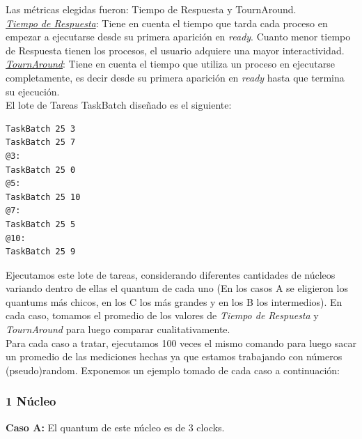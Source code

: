\documentclass[a4paper]{article}
\begin{document}
Las m\'etricas elegidas fueron: Tiempo de Respuesta y TournAround.\\


\underline{\emph{Tiempo de Respuesta}}: Tiene en cuenta el tiempo que tarda cada proceso en empezar a ejecutarse desde su primera aparici\'on en \textit{ready}. Cuanto menor tiempo de Respuesta tienen los procesos, el usuario adquiere una mayor interactividad.\\

\underline{\emph{TournAround}}: Tiene en cuenta el tiempo que utiliza un proceso en ejecutarse completamente, es decir desde su primera aparici\'on en \textit{ready} hasta que termina su ejecuci\'on.\\



El lote de Tareas TaskBatch dise\~nado es el siguiente:
	\begin{codesnippet}
	\begin{verbatim}
TaskBatch 25 3
TaskBatch 25 7
@3:
TaskBatch 25 0
@5:
TaskBatch 25 10
@7:
TaskBatch 25 5
@10:
TaskBatch 25 9
	\end{verbatim}
	\end{codesnippet}

	Ejecutamos este lote de tareas, considerando diferentes cantidades de n\'ucleos variando dentro de ellas el quantum de cada uno (En los casos A se eligieron los quantums m\'as chicos, en los C los m\'as grandes y en los B los intermedios). En cada caso, tomamos el promedio de los valores de \textit{Tiempo de Respuesta} y \textit{TournAround} para luego comparar cualitativamente.\\
	
	Para cada caso a tratar, ejecutamos 100 veces el mismo comando para luego sacar un promedio de las mediciones hechas ya que estamos trabajando con n\'umeros (pseudo)random. Exponemos un ejemplo tomado de cada caso a continuaci\'on:
	
	\subsubsection*{1 N\'ucleo}
	
	\textbf{Caso A:} El quantum de este n\'ucleo es de 3 clocks.
	
\end{document}
